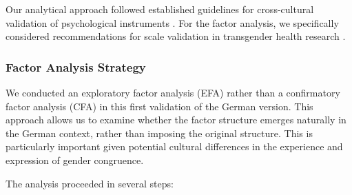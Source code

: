 \documentclass[man,floatsintext,12pt]{apa7}
\begin{document}
Our analytical approach followed established guidelines for
cross-cultural validation of psychological instruments
\citep{beaton2000}. For the factor analysis, we specifically considered
recommendations for scale validation in transgender health research
\citep{jones2019}.

\subsubsection{Factor Analysis Strategy}\label{factor-analysis-strategy}

We conducted an exploratory factor analysis (EFA) rather than a
confirmatory factor analysis (CFA) in this first validation of the
German version. This approach allows us to examine whether the factor
structure emerges naturally in the German context, rather than imposing
the original structure. This is particularly important given potential
cultural differences in the experience and expression of gender
congruence.

The analysis proceeded in several steps:
\end{document}
